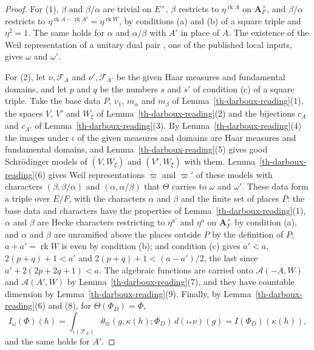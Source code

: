 \begin{proof}
For (1), $\beta$ and $\beta/\alpha$ are trivial on $E^\times$, $\beta$
restricts to $\eta^{\operatorname{rk}A}$ on $\mathbf A_F^\times$, and
$\beta/\alpha$ restricts to
$\eta^{\operatorname{rk}A-\operatorname{rk}A'}=\eta^{\operatorname{rk}W}$, by
conditions (a) and (b) of a square triple and $\eta^2=1$. The same holds for
$\alpha$ and $\alpha/\beta$ with $A'$ in place of $A$. The existence of the
Weil representation of a unitary dual pair \cite{Kud94,HKS96}, one of the
published local inputs, gives $\omega$ and $\omega'$.

For (2), let $\nu,\mathcal F_A$ and $\nu',\mathcal F_{A'}$ be the given Haar
measures and fundamental domains, and let $p$ and $q$ be the numbers $s$ and
$s'$ of condition (c) of a square triple. Take the base data $P$, $v_1$,
$m_\alpha$ and $m_\beta$ of Lemma~\ref{th-darboux-reading}(1), the spaces $V$,
$V'$ and $W_\xi$ of Lemma~\ref{th-darboux-reading}(2) and the bijections $c_A$
and $c_{A'}$ of Lemma~\ref{th-darboux-reading}(3). By
Lemma~\ref{th-darboux-reading}(4) the images under $\iota$ of the given
measures and domains are Haar measures and fundamental domains, and
Lemma~\ref{th-darboux-reading}(5) gives good Schrödinger models of
$(V,W_\xi)$ and $(V',W_\xi)$ with them. Lemma~\ref{th-darboux-reading}(6)
gives Weil representations $\varpi$ and $\varpi'$ of these models with
characters $(\beta,\beta/\alpha)$ and $(\alpha,\alpha/\beta)$ that $\Theta$
carries to $\omega$ and $\omega'$. These data form a triple over $E/F$, with
the characters $\alpha$ and $\beta$ and the finite set of places $P$: the
base data and characters have the properties of
Lemma~\ref{th-darboux-reading}(1), $\alpha$ and $\beta$ are Hecke characters
restricting to $\eta^{a'}$ and $\eta^a$ on $\mathbf A_F^\times$ by condition
(a), and $\alpha$ and $\beta$ are unramified above the places outside $P$ by
the definition of $P$; $a+a'=\operatorname{rk}W$ is even by condition (b);
and condition (c) gives $a'<a$, $2(p+q)+1<a'$ and
$2(p+q)+1<(a-a')/2$, the last since $a'+2(2p+2q+1)<a$. The algebraic
functions are carried onto $\mathcal A(-A,W)$ and $\mathcal A(A',W)$ by
Lemma~\ref{th-darboux-reading}(7), and they have countable dimension by
Lemma~\ref{th-darboux-reading}(9). Finally, by
Lemma~\ref{th-darboux-reading}(6) and (8), for $\Theta(\Phi_D)=\Phi$,
\[
I_\omega(\Phi)(h)=\int_{\iota(\mathcal F_A)}\theta_\varpi(g,\kappa(h);\Phi_D)\,d(\iota_*\nu)(g)=I(\Phi_D)(\kappa(h)),
\]
and the same holds for $A'$.


\end{proof}
